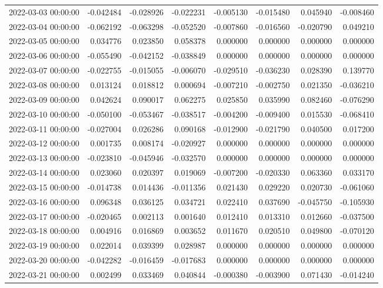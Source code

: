 \begin{tabular}{lrrrrrrr}
2022-03-03 00:00:00 & -0.042484 & -0.028926 & -0.022231 & -0.005130 & -0.015480 & 0.045940 & -0.008460 \\
2022-03-04 00:00:00 & -0.062192 & -0.063298 & -0.052520 & -0.007860 & -0.016560 & -0.020790 & 0.049210 \\
2022-03-05 00:00:00 & 0.034776 & 0.023850 & 0.058378 & 0.000000 & 0.000000 & 0.000000 & 0.000000 \\
2022-03-06 00:00:00 & -0.055490 & -0.042152 & -0.038849 & 0.000000 & 0.000000 & 0.000000 & 0.000000 \\
2022-03-07 00:00:00 & -0.022755 & -0.015055 & -0.006070 & -0.029510 & -0.036230 & 0.028390 & 0.139770 \\
2022-03-08 00:00:00 & 0.013124 & 0.018812 & 0.000694 & -0.007210 & -0.002750 & 0.021350 & -0.036210 \\
2022-03-09 00:00:00 & 0.042624 & 0.090017 & 0.062275 & 0.025850 & 0.035990 & 0.082460 & -0.076290 \\
2022-03-10 00:00:00 & -0.050100 & -0.053467 & -0.038517 & -0.004200 & -0.009400 & 0.015530 & -0.068410 \\
2022-03-11 00:00:00 & -0.027004 & 0.026286 & 0.090168 & -0.012900 & -0.021790 & 0.040500 & 0.017200 \\
2022-03-12 00:00:00 & 0.001735 & 0.008174 & -0.020927 & 0.000000 & 0.000000 & 0.000000 & 0.000000 \\
2022-03-13 00:00:00 & -0.023810 & -0.045946 & -0.032570 & 0.000000 & 0.000000 & 0.000000 & 0.000000 \\
2022-03-14 00:00:00 & 0.023060 & 0.020397 & 0.019069 & -0.007200 & -0.020330 & 0.063360 & 0.033170 \\
2022-03-15 00:00:00 & -0.014738 & 0.014436 & -0.011356 & 0.021430 & 0.029220 & 0.020730 & -0.061060 \\
2022-03-16 00:00:00 & 0.096348 & 0.036125 & 0.034721 & 0.022410 & 0.037690 & -0.045750 & -0.105930 \\
2022-03-17 00:00:00 & -0.020465 & 0.002113 & 0.001640 & 0.012410 & 0.013310 & 0.012660 & -0.037500 \\
2022-03-18 00:00:00 & 0.004916 & 0.016869 & 0.003652 & 0.011670 & 0.020510 & 0.049800 & -0.070120 \\
2022-03-19 00:00:00 & 0.022014 & 0.039399 & 0.028987 & 0.000000 & 0.000000 & 0.000000 & 0.000000 \\
2022-03-20 00:00:00 & -0.042282 & -0.016459 & -0.017683 & 0.000000 & 0.000000 & 0.000000 & 0.000000 \\
2022-03-21 00:00:00 & 0.002499 & 0.033469 & 0.040844 & -0.000380 & -0.003900 & 0.071430 & -0.014240 \\

\end{tabular}
